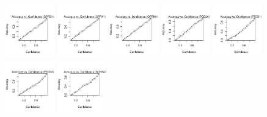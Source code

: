 \documentclass[10pt,article]{memoir}
\begin{document}
\begin{figure}[h!]
\includegraphics[width=0.19\textwidth]{figures/calibration_plots/oprd1_calib.pdf}
\includegraphics[width=0.19\textwidth]{figures/calibration_plots/oprk1_calib.pdf}
\includegraphics[width=0.19\textwidth]{figures/calibration_plots/oprm1_calib.pdf}
\includegraphics[width=0.19\textwidth]{figures/calibration_plots/pde3a_calib.pdf}
\includegraphics[width=0.19\textwidth]{figures/calibration_plots/ptgs1_calib.pdf}
\includegraphics[width=0.19\textwidth]{figures/calibration_plots/ptgs2_calib.pdf}
\includegraphics[width=0.19\textwidth]{figures/calibration_plots/scn5a_calib.pdf}

\end{figure}
\end{document}
